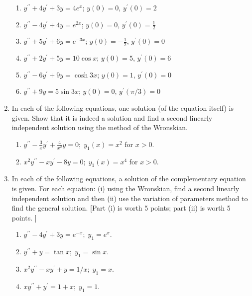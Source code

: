 \documentclass[fleqn]{article}
\begin{document}
\begin{enumerate}
      \begin{enumerate}
      \item $y^{\prime \prime }+4y^{\prime }+3y=4e^{x}$; $y\left( 0\right) =0$, $y^{\prime }\left( 0\right) =2$
      
      \item $y^{\prime \prime }-4y^{\prime }+4y=e^{2x}$; $y\left( 0\right) =0$, $y^{\prime }\left( 0\right) =\frac{1}{2}$
      
      \item $y^{\prime \prime }+5y^{\prime }+6y=e^{-3x}$; $y\left( 0\right) =-\frac{1}{2}$, $y^{\prime }\left( 0\right) =0$
      
      \item $y^{\prime \prime }+2y^{\prime }+5y=10\cos x$; $y\left( 0\right) =5$, $y^{\prime }\left( 0\right) =6$
      
      \item $y^{\prime \prime }-6y^{\prime }+9y=\cosh 3x$; $y\left( 0\right) =1$, $y^{\prime }\left( 0\right) =0$
      
      \item $y^{\prime \prime }+9y=5\sin 3x$; $y\left( 0\right) =0$, $y^{\prime}\left( \pi/3\right) =0$
      \end{enumerate}
    
    
    \item In each of the following equations, one solution (of the equation itself) is given. Show that it is indeed a solution and find a second linearly independent solution using the method of the Wronskian. 
      \begin{enumerate}
      \item $y^{\prime \prime }-\frac{\textstyle 3}{\textstyle x}y^{\prime }+\frac{\textstyle 4}{\textstyle x^{2}} y=0;\;y_{1}\left( x\right) =x^{2}$ for $x>0.$
      
      \item $x^{2}y^{\prime \prime }-xy^{\prime }-8y=0;\;y_{1}\left( x\right) =x^{4}$ for $x>0.$
      \end{enumerate}
    
    
    \item In each of the following equations, a solution of the complementary equation is given. For each equation: (i) using the Wronskian, find a second linearly independent solution and then (ii) use the variation of parameters method to find the general solution. [Part (i) is worth 5 points; part (ii) is worth 5 points.  ]
      \begin{enumerate}
      \item $y^{\prime \prime }-4y^{\prime }+3y=e^{-x};\;y_{1}=e^{x}.$
      
      \item $y^{\prime \prime }+y=\tan x;\;y_{1}=\sin x.$
      
      \item $x^{2}y^{\prime \prime }-xy^{\prime }+y=1/x;\;y_{1}=x.$
      
      \item $xy^{\prime \prime }+y^{\prime }=1+x;\;y_{1}=1.$
      \end{enumerate}

    
  \end{enumerate}
\end{document}
